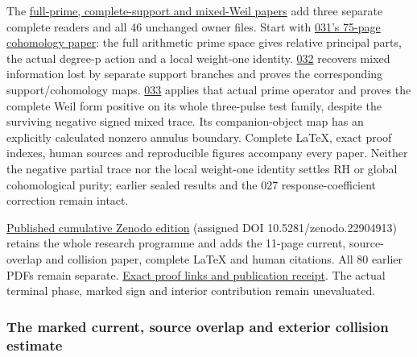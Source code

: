 \documentclass[
]{article}
\begin{document}
The
\href{https://github.com/KokunoYumeto/zeta-function-research-reader/blob/main/workbenches/splitzero-tandem/continuations/20260923-full-prime-support/README.md}{full-prime,
complete-support and mixed-Weil papers} add three separate complete
readers and all 46 unchanged owner files. Start with
\href{https://github.com/KokunoYumeto/zeta-function-research-reader/blob/main/workbenches/splitzero-tandem/continuations/20260923-full-prime-support/031/02_REBUILT_MATHEMATICS.pdf}{031's
75-page cohomology paper}: the full arithmetic prime space gives
relative principal parts, the actual degree-p action and a local
weight-one identity.
\href{https://github.com/KokunoYumeto/zeta-function-research-reader/blob/main/workbenches/splitzero-tandem/continuations/20260923-full-prime-support/032/RECOVERED_PROGRAMME.pdf}{032}
recovers mixed information lost by separate support branches and proves
the corresponding support/cohomology maps.
\href{https://github.com/KokunoYumeto/zeta-function-research-reader/blob/main/workbenches/splitzero-tandem/continuations/20260923-full-prime-support/033/MIXED_PRIME_ENERGY_AND_BOUNDARY.pdf}{033}
applies that actual prime operator and proves the complete Weil form
positive on its whole three-pulse test family, despite the surviving
negative signed mixed trace. Its companion-object map has an explicitly
calculated nonzero annulus boundary. Complete LaTeX, exact proof
indexes, human sources and reproducible figures accompany every paper.
Neither the negative partial trace nor the local weight-one identity
settles RH or global cohomological purity; earlier sealed results and
the 027 response-coefficient correction remain intact.

\href{https://zenodo.org/records/22904913}{Published cumulative Zenodo
edition} (assigned DOI 10.5281/zenodo.22904913) retains the whole
research programme and adds the 11-page current, source-overlap and
collision paper, complete LaTeX and human citations. All 80 earlier PDFs
remain separate.
\href{https://github.com/KokunoYumeto/zeta-function-research-reader/blob/main/workbenches/splitzero-tandem/continuations/20260922-current-collision-publication/README.md}{Exact
proof links and publication receipt}. The actual terminal phase, marked
sign and interior contribution remain unevaluated.

\subsubsection{The marked current, source overlap and exterior collision
estimate}\label{the-marked-current-source-overlap-and-exterior-collision-estimate}
\end{document}
